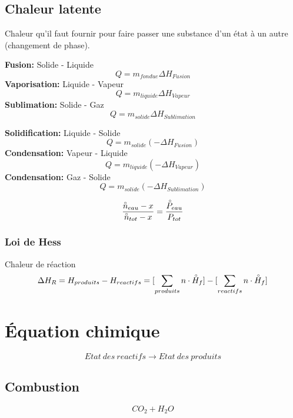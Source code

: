 \documentclass[twocolumn,letterpaper,8pt]{extarticle}
\begin{document}
\subsection{Chaleur latente}
Chaleur qu’il faut fournir pour faire passer une substance d'un état à un autre (changement de phase).
\begin{center}
    \textbf{Fusion:} Solide - Liquide
    $$Q=m_{fondue}\Delta H_{Fusion}$$
    \textbf{Vaporisation:} Liquide - Vapeur
    $$Q=m_{liquide}\Delta H_{Vapeur}$$
    \textbf{Sublimation:} Solide - Gaz
    $$Q=m_{solide}\Delta H_{Sublimation}$$
\end{center}

\begin{center}
    \textbf{Solidification:} Liquide - Solide
    $$Q=m_{solide}(-\Delta H_{Fusion})$$
    \textbf{Condensation:} Vapeur - Liquide
    $$Q=m_{liquide}(-\Delta H_{Vapeur})$$
    \textbf{Condensation:} Gaz - Solide
    $$Q=m_{solide}(-\Delta H_{Sublimation})$$
\end{center}

$$\frac{\accentset{\circ}{n}_{eau}-x}{\accentset{\circ}{n}_{tot}-x} = \frac{\accentset{\circ}{P}_{eau}}{P_{tot}}$$

\subsubsection{Loi de Hess}
Chaleur de réaction
$$\Delta H_R = H_{produits}-H_{reactifs} = [\sum\limits_{produits} n \cdot \accentset{\circ}{H}_{f}] - [\sum\limits_{reactifs} n \cdot \accentset{\circ}{H}_{f}]$$


\section{Équation chimique}
$$Etat\ des\ reactifs \rightarrow Etat\ des\ produits$$
\subsection{Combustion}
$$CO_2+H_2O$$
\end{document}
